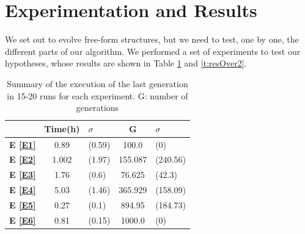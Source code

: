 \documentclass[sigconf]{acmart}
\newcommand{\myfloatalign}{\centering} %
\begin{document}
\section{Experimentation and Results}\label{ch:res}

We set out to evolve free-form structures, but we need to test, one by
one, the different parts of our algorithm.
We performed a set of experiments to test our hypotheses,
whose results are shown in Table \ref{t:resOver1} and \ref{t:resOver2}.

\begin{table}
	\myfloatalign
	\begin{tabular}{cclcl}
		& \textbf{Time(h)} &$\sigma$ & \textbf{G}& $\sigma$ \\ \hline
		\textbf{E \ref{E1}}&0.89&(0.59)&100.0&(0)\\  \hline
		\textbf{E \ref{E2}}&1.002&(1.97)&155.087&(240.56) \\  \hline
		\textbf{E \ref{E3}}&1.76&(0.6)&76.625&(42.3)\\  \hline
		\textbf{E \ref{E4}}&5.03&(1.46)&365.929&(158.09)  \\  \hline
		\textbf{E \ref{E5}}&0.27&(0.1)&894.95&(184.73)     \\  \hline 
		\textbf{E \ref{E6}}&0.81&(0.15)&1000.0&(0) \\  \hline
		\hline
	\end{tabular}
	\caption{Summary of the execution of the last generation in 15-20 runs for 
	each experiment.
		G: number of generations} %
	\label{t:resOver1}
\end{table}
\end{document}

